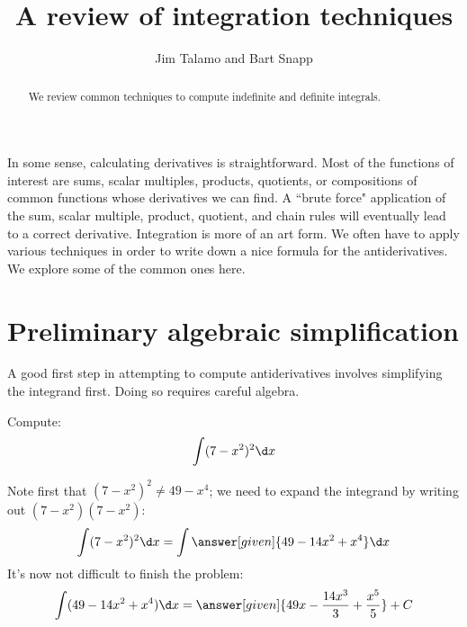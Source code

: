 \documentclass[nooutcomes]{ximera}
\author{Jim Talamo and Bart Snapp}
\title[Dig-In:]{A review of integration techniques}
\begin{document}
\begin{abstract}
  We review common techniques to compute indefinite and definite integrals.
\end{abstract}
\maketitle

In some sense, calculating derivatives is straightforward.  Most of the functions of interest are sums, scalar multiples, products, quotients, or compositions of common functions whose derivatives we can find.  A ``brute force" application of the sum, scalar multiple, product, quotient, and chain rules will eventually lead to a correct derivative.  Integration is more of an art form.  We often have to apply various techniques in order to write down a nice formula for the antiderivatives. We explore some of the common ones here.

\section{Preliminary algebraic simplification}


A good first step in attempting to compute antiderivatives involves simplifying the integrand first.  Doing so requires careful algebra.
\begin{example}
  Compute:
  \[
  \int (7-x^2)^2 \d x
  \]
  \begin{explanation}
   Note first that $(7-x^2)^2 \neq 49-x^4$; we need to expand the integrand by writing out $(7-x^2)(7-x^2)$:
    \[
    \int (7-x^2)^2 \d x  = \int \answer[given]{49 - 14x^2 + x^4} \d x
    \]
    It's now not difficult to finish the problem:
    \[
    \int (49 - 14x^2 + x^4) \d x = \answer[given]{49x - \frac{14 x^3}{3} + \frac{x^5}{5}} + C
    \]
  \end{explanation}
\end{example}


%
%
%
\end{document}
